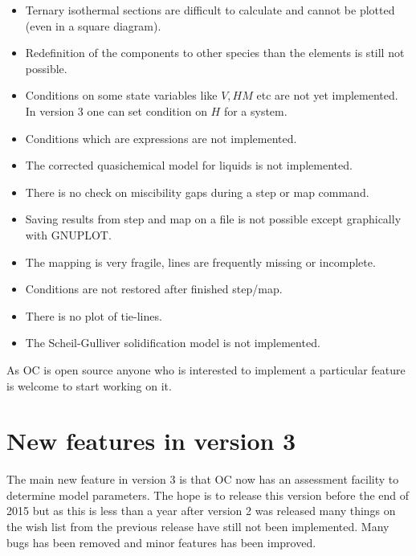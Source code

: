 \documentclass[12pt]{article}
\begin{document}
\begin{itemize}
\item Ternary isothermal sections are difficult to calculate and
  cannot be plotted (even in a square diagram).

\item Redefinition of the components to other species than the
  elements is still not possible.

\item Conditions on some state variables like $V, HM$ etc are not yet
  implemented.  In version 3 one can set condition on $H$ for a
  system.

\item Conditions which are expressions are not implemented.

\item The corrected quasichemical model for liquids is not
  implemented.

\item There is no check on miscibility gaps during a step or map
  command.

\item Saving results from step and map on a file is not possible
  except graphically with GNUPLOT.

\item The mapping is very fragile, lines are frequently missing or
  incomplete.

\item Conditions are not restored after finished step/map.

\item There is no plot of tie-lines.

\item The Scheil-Gulliver solidification model is not implemented.

\end{itemize}

As OC is open source anyone who is interested to implement a
particular feature is welcome to start working on it.

\section{New features in version 3}

The main new feature in version 3 is that OC now has an assessment
facility to determine model parameters.  The hope is to release this
version before the end of 2015 but as this is less than a year after
version 2 was released many things on the wish list from the previous
release have still not been implemented.  Many bugs has been removed
and minor features has been improved.
\end{document}
